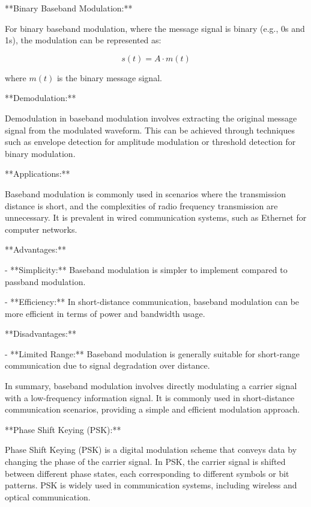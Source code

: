 \documentclass[../../../../DMCC-My-Notebook]{subfiles}
\begin{document}
	**Binary Baseband Modulation:**
	
	For binary baseband modulation, where the message signal is binary (e.g., 0s and 1s), the modulation can be represented as:
	
	\[ s(t) = A \cdot m(t) \]
	
	where \(m(t)\) is the binary message signal.
	
	**Demodulation:**
	
	Demodulation in baseband modulation involves extracting the original message signal from the modulated waveform. This can be achieved through techniques such as envelope detection for amplitude modulation or threshold detection for binary modulation.
	
	**Applications:**
	
	Baseband modulation is commonly used in scenarios where the transmission distance is short, and the complexities of radio frequency transmission are unnecessary. It is prevalent in wired communication systems, such as Ethernet for computer networks.
	
	**Advantages:**
	
	- **Simplicity:** Baseband modulation is simpler to implement compared to passband modulation.
	
	- **Efficiency:** In short-distance communication, baseband modulation can be more efficient in terms of power and bandwidth usage.
	
	**Disadvantages:**
	
	- **Limited Range:** Baseband modulation is generally suitable for short-range communication due to signal degradation over distance.
	
	In summary, baseband modulation involves directly modulating a carrier signal with a low-frequency information signal. It is commonly used in short-distance communication scenarios, providing a simple and efficient modulation approach.
	
	
	
	
	
	
	
	
	
	
	
	**Phase Shift Keying (PSK):**
	
	Phase Shift Keying (PSK) is a digital modulation scheme that conveys data by changing the phase of the carrier signal. In PSK, the carrier signal is shifted between different phase states, each corresponding to different symbols or bit patterns. PSK is widely used in communication systems, including wireless and optical communication.
	
\end{document}
